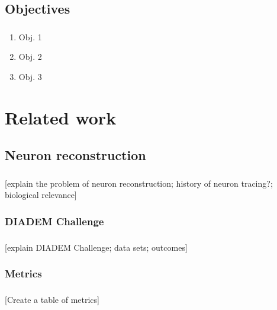 \documentclass{beamer}
\begin{document}
\subsection{Objectives}
\begin{frame}\frametitle{\subsecname}
	\begin{enumerate}
		\item Obj. 1
		\item Obj. 2
		\item Obj. 3
	\end{enumerate}
\end{frame}

\section{Related work}
\begin{frame}\frametitle{\secname}

\end{frame}

\subsection{Neuron reconstruction}
\begin{frame}\frametitle{\subsecname}
	[explain the problem of neuron reconstruction; history of
	neuron tracing?; biological relevance]
\end{frame}

\subsubsection{DIADEM Challenge}
\begin{frame}\frametitle{\subsubsecname}
	[explain DIADEM Challenge; data sets; outcomes]
\end{frame}

\subsubsection{Metrics}
\begin{frame}\frametitle{\subsubsecname}
	[Create a table of metrics]
\end{frame}
\end{document}
